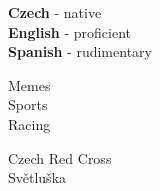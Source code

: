 \documentclass[9pt]{developercv} %
\begin{document}
\begin{minipage}[t]{0.2\textwidth}
	\vspace{-\baselineskip} %

	
	\textbf{Czech} - native\\
	\textbf{English} - proficient\\
	\textbf{Spanish} - rudimentary\\
\end{minipage}
\hfill
\begin{minipage}[t]{0.2\textwidth}
	\vspace{-\baselineskip} %
	

	Memes\\
	Sports\\
	Racing
\end{minipage}
\hfill
\begin{minipage}[t]{0.15\textwidth}
	\vspace{-\baselineskip} %
	
	
	Czech Red Cross\\
	Světluška
\end{minipage}

\end{document}
